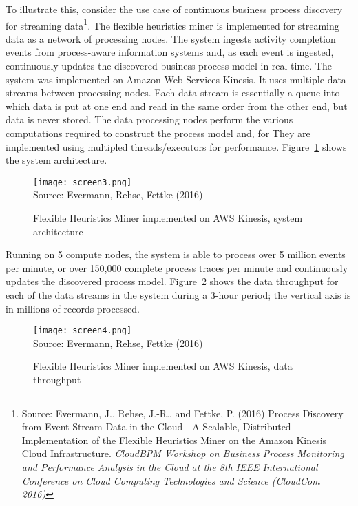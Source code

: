 To illustrate this, consider the use case of continuous business process discovery for streaming data\footnote{Source: Evermann, J., Rehse, J.-R., and Fettke, P. (2016) Process Discovery from Event Stream Data in the Cloud - A Scalable, Distributed Implementation of the Flexible Heuristics Miner on the Amazon Kinesis Cloud Infrastructure. \emph{CloudBPM Workshop on Business Process Monitoring and Performance Analysis in the Cloud at the 8th IEEE International Conference on Cloud Computing Technologies and Science (CloudCom 2016)}}. The flexible heuristics miner is implemented for streaming data as a network of processing nodes. The system ingests activity completion events from process-aware information systems and, as each event is ingested, continuously updates the discovered business process model in real-time. The system was implemented on Amazon Web Services Kinesis. It uses multiple data streams between processing nodes. Each data stream is essentially a queue into which data is put at one end and read in the same order from the other end, but data is never stored. The data processing nodes perform the various computations required to construct the process model and, for  They are implemented using multipled threads/executors for performance. Figure~\ref{fig:fhmkinesis} shows the system architecture. 

\begin{figure}
\centering

\texttt{[image: screen3.png]} \\

\scriptsize Source: Evermann, Rehse, Fettke (2016)\normalsize
\caption[FHM on AWS Kinesis -- system architecture]{Flexible Heuristics Miner implemented on AWS Kinesis, system architecture}
\label{fig:fhmkinesis}
\end{figure}

Running on 5 compute nodes, the system is able to process over 5 million events per minute, or over 150,000 complete process traces per minute and continuously updates the discovered process model. Figure~\ref{fig:fhmkinesisperformance} shows the data throughput for each of the data streams in the system during a 3-hour period; the vertical axis is in millions of records processed.

\begin{figure}
\centering

\texttt{[image: screen4.png]} \\

\scriptsize Source: Evermann, Rehse, Fettke (2016) \normalsize
\caption[FHM on AWS Kinesis -- data throughput]{Flexible Heuristics Miner implemented on AWS Kinesis, data throughput}
\label{fig:fhmkinesisperformance}
\end{figure}


